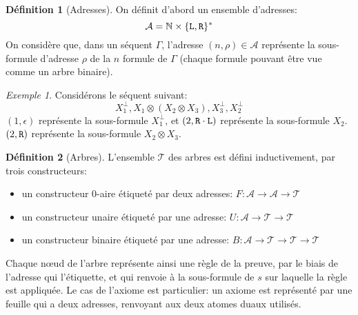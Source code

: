 \documentclass[11pt,a4paper]{article}
\theoremstyle{plain}
\theoremstyle{definition}
\newtheorem{definition}{Définition}
\theoremstyle{remark}
\newtheorem{example}{Exemple}
\newcommand*{\orth}{^\perp}
\newcommand*{\tensor}{\otimes}
\newcommand*{\sequent}{\Gamma}
\newcommand*{\Left}{\textnormal{\texttt{L}}}
\newcommand*{\Right}{\textnormal{\texttt{R}}}
\newcommand*{\trees}{\ensuremath{\mathcal{T}}}
\begin{document}
\begin{definition}[Adresses]
On définit d'abord un ensemble d'adresses:
\begin{equation*}
\mathcal{A} = \mathbb{N} \times \{ \Left, \Right\}^{*}  
\end{equation*}
On considère que, dans un séquent $\sequent$, l'adresse $(n, \rho) \in \mathcal{A}$ représente la sous-formule d'adresse $\rho$ de la $n$\ieme{} formule de $\sequent$ (chaque formule pouvant être vue comme un arbre binaire).
\end{definition}

\begin{example}
Considérons le séquent suivant:
\begin{equation*}
X_1\orth, X_1 \tensor (X_2 \tensor X_3), X_3\orth, X_2\orth
\end{equation*}
$(1, \epsilon)$ représente la sous-formule $X_1\orth$, et $(2, \Right \cdot \Left)$ représente la sous-formule $X_2$. $(2, \Right)$ représente la sous-formule $X_2 \tensor X_3$.
\end{example}

\begin{definition}[Arbres]
L'ensemble \trees{} des arbres est défini inductivement, par trois constructeurs:
\begin{itemize}
  \item{un constructeur $0$-aire étiqueté par deux adresses: $F: \mathcal{A} \rightarrow \mathcal{A} \rightarrow \trees$}
  \item{un constructeur unaire étiqueté par une adresse: $U: \mathcal{A} \rightarrow \trees \rightarrow \trees$}
  \item{un constructeur binaire étiqueté par une adresse: $B: \mathcal{A} \rightarrow \trees \rightarrow \trees \rightarrow \trees$}
\end{itemize}
\end{definition}

Chaque n\oe ud de l'arbre représente ainsi une règle de la preuve, par le biais de l'adresse qui l'étiquette, et qui renvoie à la sous-formule de $s$ sur laquelle la règle est appliquée. Le cas de l'axiome est particulier: un axiome est représenté par une feuille qui a deux adresses, renvoyant aux deux atomes duaux utilisés.
\end{document}
